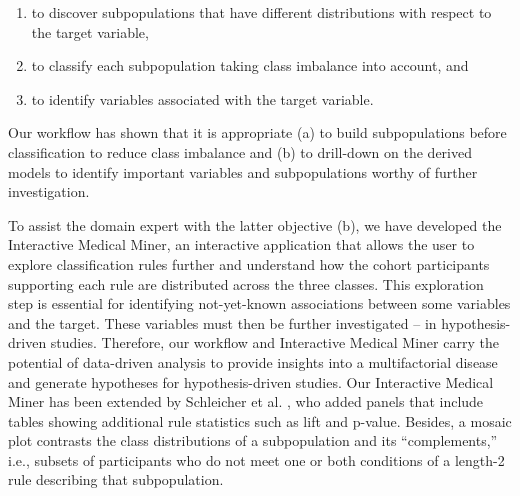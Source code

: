 \documentclass[
  oneside]{book}
\providecommand{\tightlist}{%
  \setlength{\itemsep}{0pt}\setlength{\parskip}{0pt}}
\begin{document}
\begin{enumerate}
\def\labelenumi{\roman{enumi}.}
\tightlist
\item
  to discover subpopulations that have different distributions with respect to the target variable,
\item
  to classify each subpopulation taking class imbalance into account, and
\item
  to identify variables associated with the target variable.
\end{enumerate}

Our workflow has shown that it is appropriate (a) to build subpopulations before classification to reduce class imbalance and (b) to drill-down on the derived models to identify important variables and subpopulations worthy of further investigation.

To assist the domain expert with the latter objective (b), we have developed the Interactive Medical Miner, an interactive application that allows the user to explore classification rules further and understand how the cohort participants supporting each rule are distributed across the three classes.
This exploration step is essential for identifying not-yet-known associations between some variables and the target.
These variables must then be further investigated -- in hypothesis-driven studies.
Therefore, our workflow and Interactive Medical Miner carry the potential of data-driven analysis to provide insights into a multifactorial disease and generate hypotheses for hypothesis-driven studies.
Our Interactive Medical Miner has been extended by Schleicher et al. \autocite{Schleicher:CBMS17}, who added panels that include tables showing additional rule statistics such as lift and p-value.
Besides, a mosaic plot contrasts the class distributions of a subpopulation and its ``complements,'' i.e., subsets of participants who do not meet one or both conditions of a length-2 rule describing that subpopulation.
\end{document}
